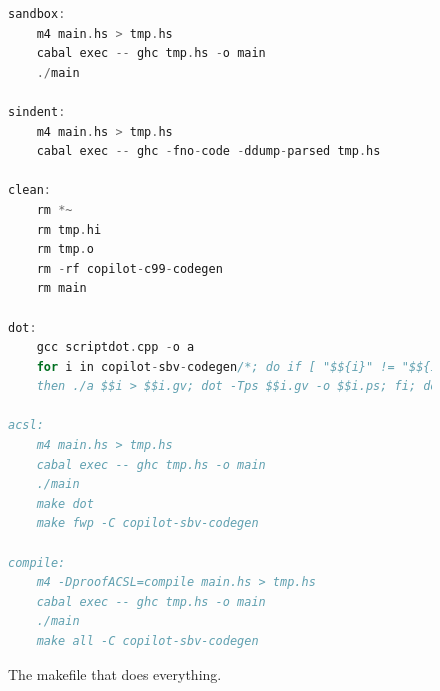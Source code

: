 \begin{figure}[!htb]
	\begin{lstlisting}[language=C]	
sandbox:
	m4 main.hs > tmp.hs
	cabal exec -- ghc tmp.hs -o main
	./main
	
sindent:
	m4 main.hs > tmp.hs
	cabal exec -- ghc -fno-code -ddump-parsed tmp.hs

clean:
	rm *~
	rm tmp.hi
	rm tmp.o
	rm -rf copilot-c99-codegen
	rm main
		
dot:
	gcc scriptdot.cpp -o a
	for i in copilot-sbv-codegen/*; do if [ "$${i}" != "$${i%.c}" ]; \
	then ./a $$i > $$i.gv; dot -Tps $$i.gv -o $$i.ps; fi; done

acsl:
	m4 main.hs > tmp.hs
	cabal exec -- ghc tmp.hs -o main
	./main
	make dot
	make fwp -C copilot-sbv-codegen

compile:
	m4 -DproofACSL=compile main.hs > tmp.hs
	cabal exec -- ghc tmp.hs -o main
	./main
	make all -C copilot-sbv-codegen

\end{lstlisting}
	\caption{The makefile that does everything.}
	\label{fig:makefile}
\end{figure}
